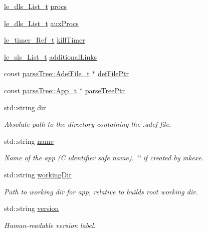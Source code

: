 \begin{DoxyCompactItemize}
\item 
\hyperlink{structle__dls___list__t}{le\+\_\+dls\+\_\+\+List\+\_\+t} \hyperlink{struct_app__t_a9f59b78e78e28eb68ae93570f7e70fbf}{procs}
\item 
\hyperlink{structle__dls___list__t}{le\+\_\+dls\+\_\+\+List\+\_\+t} \hyperlink{struct_app__t_a1656efb3d57d543c90d07a5c80f50421}{aux\+Procs}
\item 
\hyperlink{le__timer_8h_a763fa6992488cdce3b5a820817094838}{le\+\_\+timer\+\_\+\+Ref\+\_\+t} \hyperlink{struct_app__t_a8c3e38fbbdf3d07254ed93b3ac8549f4}{kill\+Timer}
\item 
\hyperlink{structle__sls___list__t}{le\+\_\+sls\+\_\+\+List\+\_\+t} \hyperlink{struct_app__t_a126d3ef53f252e760d802f8f5c5881cb}{additional\+Links}
\item 
const \hyperlink{structparse_tree_1_1_adef_file__t}{parse\+Tree\+::\+Adef\+File\+\_\+t} $\ast$ \hyperlink{struct_app__t_a6e4cbcd141b4a7ab32c9bda0808657a5}{def\+File\+Ptr}
\item 
const \hyperlink{structparse_tree_1_1_app__t}{parse\+Tree\+::\+App\+\_\+t} $\ast$ \hyperlink{struct_app__t_a6ec599361aa81d053e454bcc9081ca1c}{parse\+Tree\+Ptr}
\item 
std\+::string \hyperlink{struct_app__t_aa81475448f122c6a630dbdd7d241df3f}{dir}
\begin{DoxyCompactList}\small\item\em Absolute path to the directory containing the .adef file. \end{DoxyCompactList}\item 
std\+::string \hyperlink{struct_app__t_a35a67dd44bf6e0d4f5ca77b5d19fc714}{name}
\begin{DoxyCompactList}\small\item\em Name of the app (C identifier safe name). \char`\"{}\char`\"{} if created by mkexe. \end{DoxyCompactList}\item 
std\+::string \hyperlink{struct_app__t_af26217e7b2a8affcbcd7c90e2be5804c}{working\+Dir}
\begin{DoxyCompactList}\small\item\em Path to working dir for app, relative to build\textquotesingle{}s root working dir. \end{DoxyCompactList}\item 
std\+::string \hyperlink{struct_app__t_a1e9aa46ab4240a803633ad607cdf62ff}{version}
\begin{DoxyCompactList}\small\item\em Human-\/readable version label. \end{DoxyCompactList}\item 

\end{DoxyCompactItemize}
